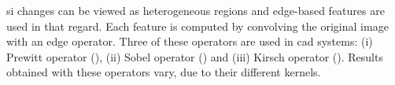\begin{enumerate}[leftmargin=*]
\Ac{si} changes can be viewed as heterogeneous regions and edge-based features are used in that regard. Each feature is computed by convolving the original image with an edge operator. Three of these operators are used in \ac{cad} systems: (i) Prewitt operator (\cite{Prewitt1970}), (ii) Sobel operator (\cite{Sobel1970}) and (iii) Kirsch operator (\cite{Kirsch1971}). Results obtained with these operators vary, due to their different kernels. %
%

\end{enumerate}
